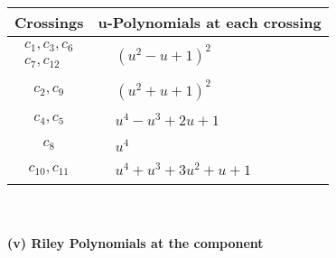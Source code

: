 \documentclass[1p]{elsarticle_modified}
\theoremstyle{definition}
\begin{document}
\begin{tabular}{m{50pt}|m{274pt}}
Crossings & \hspace{64pt}u-Polynomials at each crossing \\
\hline $$\begin{aligned}c_{1},c_{3},c_{6}\\c_{7},c_{12}\end{aligned}$$&$\begin{aligned}
&(u^2- u+1)^2
\end{aligned}$\\
\hline $$\begin{aligned}c_{2},c_{9}\end{aligned}$$&$\begin{aligned}
&(u^2+u+1)^2
\end{aligned}$\\
\hline $$\begin{aligned}c_{4},c_{5}\end{aligned}$$&$\begin{aligned}
&u^4- u^3+2 u+1
\end{aligned}$\\
\hline $$\begin{aligned}c_{8}\end{aligned}$$&$\begin{aligned}
&u^4
\end{aligned}$\\
\hline $$\begin{aligned}c_{10},c_{11}\end{aligned}$$&$\begin{aligned}
&u^4+u^3+3 u^2+u+1
\end{aligned}$\\
\hline
\end{tabular}\\~\\
\newpage\renewcommand{\arraystretch}{1}
\flushleft \textbf{(v) Riley Polynomials at the component}\newline \\
\end{document}
